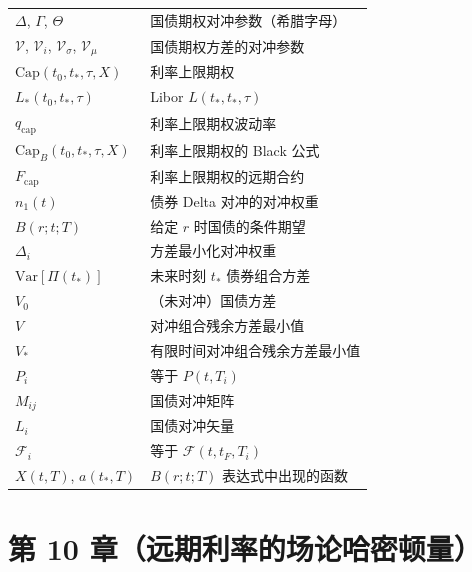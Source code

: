 \begin{center}
\begin{tabular}{@{}L{3.2cm}L{10.6cm}@{}}
\toprule
$\Delta$, $\Gamma$, $\Theta$ & 国债期权对冲参数（希腊字母） \\
$\mathcal{V}$, $\mathcal{V}_i$, $\mathcal{V}_{\sigma}$, $\mathcal{V}_{\mu}$ & 国债期权方差的对冲参数 \\
$\mathrm{Cap}(t_0,t_*,\tau,X)$ & 利率上限期权 \\
$L_*(t_0,t_*,\tau)$ & Libor $L(t_*,t_*,\tau)$ \\
$q_{\mathrm{cap}}$ & 利率上限期权波动率 \\
$\mathrm{Cap}_B(t_0,t_*,\tau,X)$ & 利率上限期权的 Black 公式 \\
$F_{\mathrm{cap}}$ & 利率上限期权的远期合约 \\
$n_1(t)$ & 债券 Delta 对冲的对冲权重 \\
$B(r;t;T)$ & 给定 $r$ 时国债的条件期望 \\
$\Delta_i$ & 方差最小化对冲权重 \\
$\mathrm{Var}[\Pi(t_*)]$ & 未来时刻 $t_*$ 债券组合方差 \\
$V_0$ & （未对冲）国债方差 \\
$V$ & 对冲组合残余方差最小值 \\
$V_*$ & 有限时间对冲组合残余方差最小值 \\
$P_i$ & 等于 $P(t,T_i)$ \\
$M_{ij}$ & 国债对冲矩阵 \\
$L_i$ & 国债对冲矢量 \\
$\mathcal{F}_i$ & 等于 $\mathcal{F}(t,t_F,T_i)$ \\
$X(t,T)$, $a(t_*,T)$ & $B(r;t;T)$ 表达式中出现的函数 \\
\bottomrule
\end{tabular}
\end{center}

\section*{第 10 章（远期利率的场论哈密顿量）}


